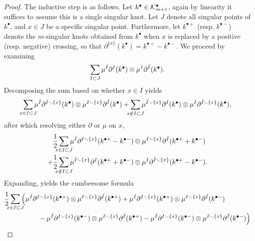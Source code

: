 \begin{proof}
	The inductive step is as follows. Let \(k^{\bullet} \in \mathcal{K}^{\bullet}_{m + 1}\), again by linearity it suffices to assume this is a single singular knot. Let \(J\) denote all singular points of \(k^{\bullet}\), and \(x \in J\) be a specific singular point. Furthermore, let \(k^{\bullet +}\) (resp. \(k^{\bullet - }\)) denote the \(m\)-singular knots obtained from \(k^{\bullet}\) when \(x\) is replaced by a positive (resp. negative) crossing, so that \(\partial^{\{x\}}(k^{\bullet}) = k^{\bullet +} - k^{\bullet -}\). We proceed by examining
	\[
		\sum_{\mathclap{I \subset J}}
			\mu^{\bar{I}}\partial^{I}(k^{\bullet})
			\otimes
			\mu^{I}\partial^{\bar{I}}(k^{\bullet}).
	\]
	Decomposing the sum based on whether \(x \in I\) yields
	\[
		\sum_{\mathclap{x \in I \subset J}}
			\mu^{\bar{I}}\partial^{I \smallsetminus \{x\}}(k^{\bullet})
			\otimes
			\mu^{I \smallsetminus \{x\}}\partial^{\bar{I}}(k^{\bullet})
			+
			\sum_{\mathclap{x \notin I \subset J}}
			\mu^{\bar{I} \smallsetminus \{x\}}\partial^{I}(k^{\bullet})
			\otimes
			\mu^{I}\partial^{\bar{I} \smallsetminus \{x\}}(k^{\bullet}),
	\]
	after which resolving either \(\partial\) or \(\mu\) on \(x\),
	\begin{align*}
		& \frac{1}{2} \sum_{\mathclap{x \in I \subset J}}
		\mu^{\bar{I}}\partial^{I \smallsetminus \{x\}}(k^{\bullet +} - k^{\bullet -})
		\otimes
		\mu^{I \smallsetminus \{x\}}\partial^{\bar{I}}(k^{\bullet +} + k^{\bullet -}) \\
		+
		& \frac{1}{2} \sum_{\mathclap{x \notin I \subset J}}
		\mu^{\bar{I} \smallsetminus \{x\}}\partial^{I}(k^{\bullet +} + k^{\bullet -})
		\otimes
		\mu^{I}\partial^{\bar{I} \smallsetminus \{x\}}(k^{\bullet +} - k^{\bullet -}).
	\end{align*}
	Expanding, yields the cumbersome formula
	\begin{align*}
		& \frac{1}{2} \sum_{\mathclap{x \in I \subset J}}
			\Big(
				\mu^{\bar{I}}\partial^{I \smallsetminus \{x\}}(k^{\bullet +})
				\otimes
				\mu^{I \smallsetminus \{x\}}\partial^{\bar{I}}(k^{\bullet +})
				+
				\mu^{\bar{I}}\partial^{I \smallsetminus \{x\}}(k^{\bullet +})
				\otimes
				\mu^{I \smallsetminus \{x\}}\partial^{\bar{I}}(k^{\bullet -}) \\
				& \qquad \qquad \quad -
				\mu^{\bar{I}}\partial^{I \smallsetminus \{x\}}(k^{\bullet -})
				\otimes
				\mu^{I \smallsetminus \{x\}}\partial^{\bar{I}}(k^{\bullet +})
				-
				\mu^{\bar{I}}\partial^{I \smallsetminus \{x\}}(k^{\bullet -})
				\otimes
				\mu^{I \smallsetminus \{x\}}\partial^{\bar{I}}(k^{\bullet -})
			\Big) \\

\end{align*}
\end{proof}
